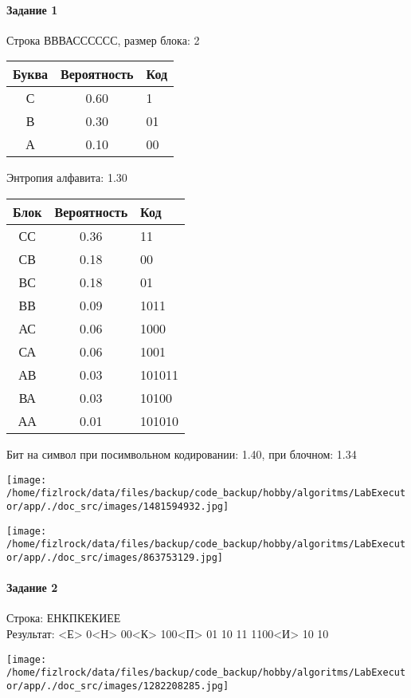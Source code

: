 \documentclass[a4paper, 12pt]{article}
\begin{document}
\paragraph{Задание 1}

Строка ВВВАСССССС, размер блока: 2
\begin{center}
 \begin{tabular}{ |c|c|l| } 
  \hline
     Буква & Вероятность & Код\\ \hline
С & 0.60 & 1\\\hline
В & 0.30 & 01\\\hline
А & 0.10 & 00
\\ \hline \end{tabular}
\end{center}
Энтропия алфавита: 1.30
\begin{center}
 \begin{tabular}{ |c|c|l| } 
  \hline
     Блок & Вероятность & Код\\ \hline
СС & 0.36 & 11\\\hline
СВ & 0.18 & 00\\\hline
ВС & 0.18 & 01\\\hline
ВВ & 0.09 & 1011\\\hline
АС & 0.06 & 1000\\\hline
СА & 0.06 & 1001\\\hline
АВ & 0.03 & 101011\\\hline
ВА & 0.03 & 10100\\\hline
АА & 0.01 & 101010
\\ \hline \end{tabular}
\end{center}
Бит на символ при посимвольном кодировании: 1.40, при блочном: 1.34

\texttt{[image: /home/fizlrock/data/files/backup/code\_backup/hobby/algoritms/LabExecutor/app/./doc\_src/images/1481594932.jpg]}

\texttt{[image: /home/fizlrock/data/files/backup/code\_backup/hobby/algoritms/LabExecutor/app/./doc\_src/images/863753129.jpg]}
\pagebreak
\paragraph{Задание 2}

Строка: 
ЕНКПКЕКИЕЕ\\
Результат: <Е> 0<Н> 00<К> 100<П> 01 10 11 1100<И> 10 10

\texttt{[image: /home/fizlrock/data/files/backup/code\_backup/hobby/algoritms/LabExecutor/app/./doc\_src/images/1282208285.jpg]}
\end{document}
